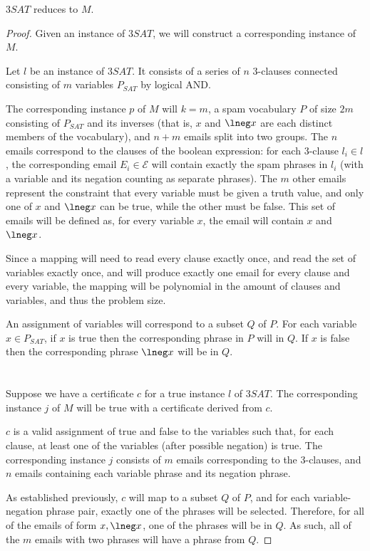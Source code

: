 \documentclass[11pt]{article}
\begin{document}
$3SAT$ reduces to $M$.
\begin{proof}
    Given an instance of $3SAT$, we will construct a corresponding instance of $M$. 

    Let $l$ be an instance of $3SAT$. It consists of a series of $n$ 3-clauses connected consisting of $m$ variables $P_{SAT}$ by logical AND. 

    The corresponding instance $p$ of $M$ will $k = m$, a spam vocabulary $P$ of size $2m$ consisting of $P_{SAT}$ and its inverses (that is, $x$ and $\lneg x$ are each distinct members of the vocabulary), and $n + m$ emails split into two groups. The $n$ emails correspond to the clauses of the boolean expression: for each 3-clause $l_i \in l$, the corresponding email $E_i \in \mathcal{E}$ will contain exactly the spam phrases in $l_i$ (with a variable and its negation counting as separate phrases). The $m$ other emails represent the constraint that every variable must be given a truth value, and only one of $x$ and $\lneg x$ can be true, while the other must be false. This set of emails will be defined as, for every variable $x$, the email will contain $x$ and $\lneg x$.   

    Since a mapping will need to read every clause exactly once, and read the set of variables exactly once, and will produce exactly one email for every clause and every variable, the mapping will be polynomial in the amount of clauses and variables, and thus the problem size.

    An assignment of variables will correspond to a subset $Q$ of $P$. For each variable $x \in P_{SAT}$, if $x$ is true then the corresponding phrase in $P$ will in $Q$. If $x$ is false then the corresponding phrase $\lneg x$ will be in $Q$. 
 \\
 \\ 
 \\ 

    Suppose we have a certificate $c$ for a true instance $l$ of $3SAT$. The corresponding instance $j$ of $M$ will be true with a certificate derived from $c$. 

    $c$ is a valid assignment of true and false to the variables such that, for each clause, at least one of the variables (after possible negation) is true. The corresponding instance $j$ consists of $m$ emails corresponding to the 3-clauses, and $n$ emails containing each variable phrase and its negation phrase. 

    As established previously, $c$ will map to a subset $Q$ of $P$, and for each variable-negation phrase pair, exactly one of the phrases will be selected. Therefore, for all of the emails of form $x, \lneg x$, one of the phrases will be in $Q$. As such, all of the $m$ emails with two phrases will have a phrase from $Q$.


\end{proof}
\end{document}

